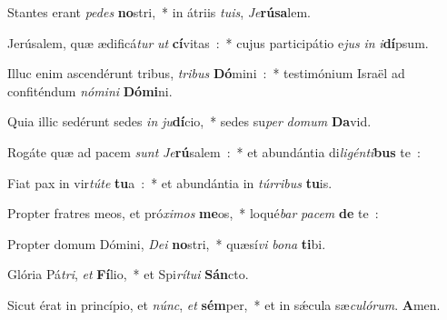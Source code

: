 ﻿\item Stantes erant \emph{pe}\-\emph{des} \textbf{no}\-stri,~* in átriis \emph{tu}\-\emph{is}, \emph{Je}\textbf{rú}\textbf{sa}lem.
\item Jerúsalem, quæ ædificá\emph{tur} \emph{ut} \textbf{cí}\-vitas~:~* cujus participátio e\emph{jus} \emph{in} \emph{i}\textbf{dí}psum.
\item Illuc enim ascendérunt tri\-bus, \emph{tri}\-\emph{bus} \textbf{Dó}\-mini~:~* testimónium Israël ad confiténdum \emph{nó}\-\emph{mi}\-\emph{ni} \textbf{Dó}\textbf{mi}ni.
\item Quia illic sedérunt sedes \emph{in} \emph{ju}\-\textbf{dí}\-cio,~* sedes su\emph{per} \emph{do}\-\emph{mum} \textbf{Da}vid.
\item Rogáte quæ ad pacem \emph{sunt} \emph{Je}\-\textbf{rú}\-salem~:~* et abundántia di\emph{li}\-\emph{gén}\-\emph{ti}\-\textbf{bus} te~:
\item Fiat pax in vir\emph{tú}\-\emph{te} \textbf{tu}a~:~* et abundántia in \emph{túr}\-\emph{ri}\-\emph{bus} \textbf{tu}is.
\item Propter fratres meos, et pró\emph{xi}\-\emph{mos} \textbf{me}\-os,~* loqué\emph{bar} \emph{pa}\-\emph{cem} \textbf{de}  te~:
\item Propter domum Dómini, \emph{De}\-\emph{i} \textbf{no}\-stri,~* quæsí\emph{vi} \emph{bo}\-\emph{na} \textbf{ti}bi.
\item Glória Pá\emph{tri}, \emph{et} \textbf{Fí}\-lio,~* et Spi\emph{rí}\-\emph{tu}\-\emph{i} \textbf{Sán}cto.
\item Sicut érat in princípio, et \emph{núnc}, \emph{et} \textbf{sém}\-per,~* et in sǽcula sæ\emph{cu}\-\emph{ló}\-\emph{rum}. \textbf{A}men.
